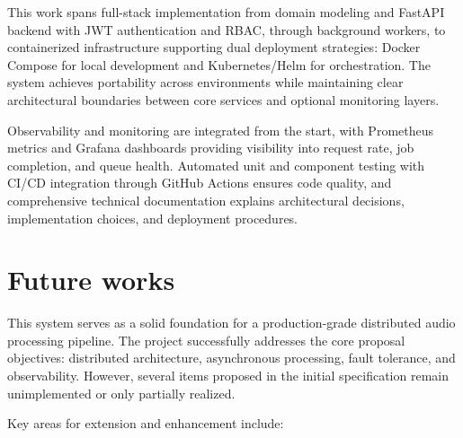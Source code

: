 \documentclass{scrartcl}
\begin{document}
This work spans full-stack implementation from domain modeling and FastAPI backend with JWT authentication and RBAC, through background workers, to containerized infrastructure supporting dual deployment strategies: Docker Compose for local development and Kubernetes/Helm for orchestration.
The system achieves portability across environments while maintaining clear architectural boundaries between core services and optional monitoring layers.

Observability and monitoring are integrated from the start, with Prometheus metrics and Grafana dashboards providing visibility into request rate, job completion, and queue health.
Automated unit and component testing with CI/CD integration through GitHub Actions ensures code quality, and comprehensive technical documentation explains architectural decisions, implementation choices, and deployment procedures.

\section{Future works}\label{future-works}



This system serves as a solid foundation for a production-grade distributed audio processing pipeline.
The project successfully addresses the core proposal objectives: distributed architecture, asynchronous processing, fault tolerance, and observability.
However, several items proposed in the initial specification remain unimplemented or only partially realized.

Key areas for extension and enhancement include:
\end{document}
